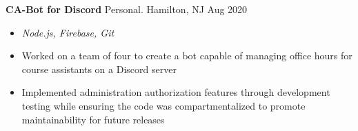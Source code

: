 \documentclass[10pt]{article}
\begin{document}
\textbf{CA-Bot for Discord} Personal. Hamilton, NJ \hfill Aug 2020\par
\begin{itemize}
	\item \textit{Node.js, Firebase, Git}
	\item Worked on a team of four to create a bot capable of managing office hours for course assistants on a Discord server
	\item Implemented administration authorization features through development testing while ensuring the code was compartmentalized to promote maintainability for future releases
\end{itemize}




\end{document}
